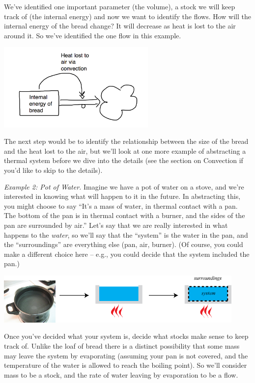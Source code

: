 We've identified one important parameter (the volume), a stock we will keep track of (the internal energy) and now we want to identify the flows. How will the internal energy of the bread change? It will decrease as heat is lost to the air around it. So we've identified the one flow in this example.

\beforefig
\centerline{\includegraphics[height=1.7in]{figs/breadstockandflow.png}}
\afterfig

The next step would be to identify the relationship between the size of the bread and the heat lost to the air, but we'll look at one more example of abstracting a thermal system before we dive into the details (see the section on Convection if you'd like to skip to the details).

{\it Example 2: Pot of Water.} Imagine we have a pot of water on a stove, and we're interested in knowing what will happen to it in the future.  In abstracting this, you might choose to say ``It's a mass of water, in thermal contact with a pan.  The bottom of the pan is in thermal contact with a burner, and the sides of the pan are surrounded by air.''  Let's say that we are really interested in what happens to the {\em water}, so we'll say that the ``system''  is the water in the pan, and the ``surroundings'' are everything else (pan, air, burner).  (Of course, you could make a different choice here -- e.g., you could decide that the system included the pan.)  

\beforefig
 \centerline{\includegraphics[height=1in]{figs/ThermalSystemAbstraction.png}}
\afterfig

Once you've decided what your system is, decide what stocks make sense to keep track of. Unlike the loaf of bread there is a distinct possibility that some mass may leave the system by evaporating (assuming your pan is not covered, and the temperature of the water is allowed to reach the boiling point). So we'll consider mass to be a stock, and the rate of water leaving by evaporation to be a flow. 

